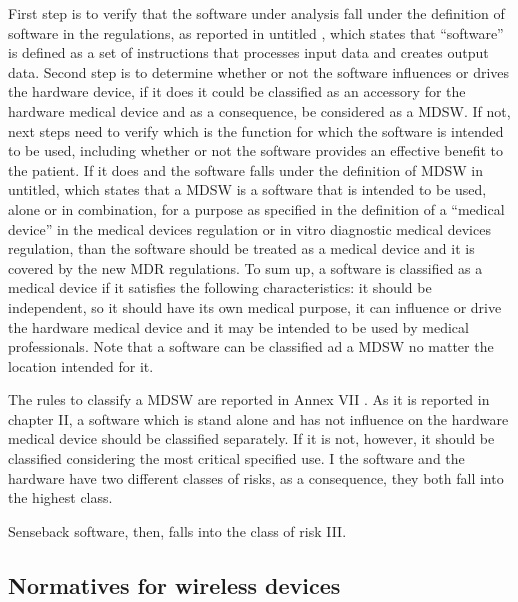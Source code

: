 \documentclass{Configuration_Files/PoliMi3i_thesis}
\begin{document}
First step is to verify that the software under analysis fall under the definition of software in the regulations, as reported in \cite{} untitled , which states that “software” is defined as a set of instructions that processes input data and creates output data. Second step is to determine whether or not the software influences or drives the hardware device, if it does it could be classified as an accessory for the hardware medical device and as a consequence, be considered as a MDSW. If not, next steps need to verify which is the function for which the software is intended to be used, including whether or not the software provides an effective benefit to the patient. If it does and the software falls under the definition of MDSW in \cite{} untitled, which states that a MDSW is a software that is intended to be used, alone or in combination, for a purpose as specified in the definition of a “medical device” in the medical devices regulation or in vitro diagnostic medical devices regulation, than the software should be treated as a medical device and it is covered by the new MDR regulations.
To sum up, a software is classified as a medical device if it satisfies the following characteristics: it should be independent, so it should have its own medical purpose, it can influence or drive the hardware medical device and it may be intended to be used by medical professionals. Note that a software can be classified ad a MDSW no matter the location intended for it.

The rules to classify a MDSW are reported in Annex VII \cite{massimopANNEXVIII2019}. As it is reported in chapter II, a software which is stand alone and has not influence on the hardware medical device should be classified separately. If it is not, however, it should be classified considering the most critical specified use. I the software and the hardware have two different classes of risks, as a consequence, they both fall into the highest class.

Senseback software, then, falls into the class of risk III. 

\subsection{Normatives for wireless devices}
\end{document}
